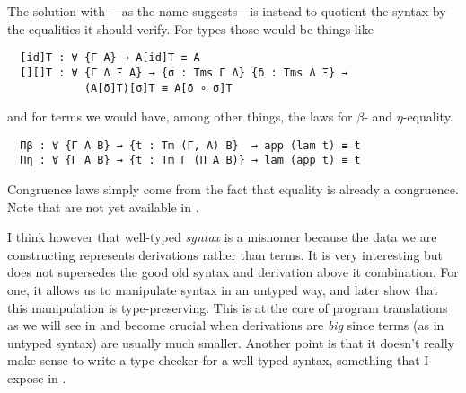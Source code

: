 The solution with ---as the name suggests---is instead to
quotient the syntax by the equalities it should verify.
For types those would be things like
\begin{verbatim}
  [id]T : ∀ {Γ A} → A[id]T ≡ A
  [][]T : ∀ {Γ Δ Ξ A} → {σ : Tms Γ Δ} {δ : Tms Δ Ξ} →
            (A[δ]T)[σ]T ≡ A[δ ∘ σ]T
\end{verbatim}
and for terms we would have, among other things, the laws for \(\beta\)- and
\(\eta\)-equality.
\begin{verbatim}
  Πβ : ∀ {Γ A B} → {t : Tm (Γ, A) B}  → app (lam t) ≡ t
  Πη : ∀ {Γ A B} → {t : Tm Γ (Π A B)} → lam (app t) ≡ t
\end{verbatim}
Congruence laws simply come from the fact that equality is already a congruence.
Note that  are not yet available in \Agda.

I think however that well-typed \emph{syntax} is a misnomer because the data we
are constructing represents derivations rather than terms.
It is very interesting but does not supersedes the good old syntax and
derivation above it combination.
For one, it allows us to manipulate syntax in an untyped way, and later show
that this manipulation is type-preserving. This is at the core of program
translations as we will see in  and become crucial when
derivations are \emph{big} since terms (as in untyped syntax) are usually
much smaller. Another point is that it doesn't really make sense to write a
type-checker for a well-typed syntax, something that I expose in
.